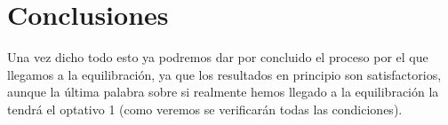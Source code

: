 \documentclass[11pt]{article} %
\begin{document}
\section{Conclusiones}

Una vez dicho todo esto ya podremos dar por concluido el proceso por el que llegamos a la equilibración, ya que los resultados en principio son satisfactorios, aunque la última palabra sobre si realmente hemos llegado a la equilibración la tendrá el optativo 1 (como veremos se verificarán todas las condiciones).




	
\end{document}
